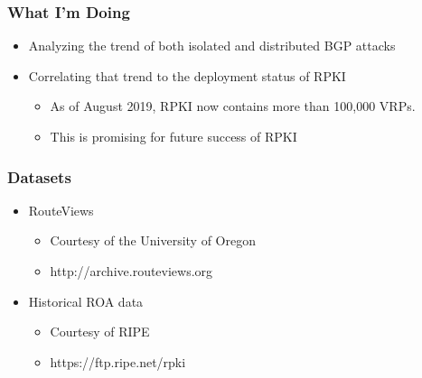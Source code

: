 \documentclass{beamer}
\begin{document}
\begin{frame}
    \frametitle{What I'm Doing}
    \pause
    \begin{itemize}
        \item Analyzing the trend of both isolated and distributed BGP attacks \pause
        \item Correlating that trend to the deployment status of RPKI \pause
        \begin{itemize}
            \item As of August 2019, RPKI now contains more than 100,000 VRPs. \pause
            \item This is promising for future success of RPKI
        \end{itemize}
    \end{itemize}
\end{frame}

\begin{frame}
    \frametitle{Datasets}
    \pause
    \begin{itemize}
        \item RouteViews
        \begin{itemize}
            \item Courtesy of the University of Oregon
            \item http://archive.routeviews.org \pause
        \end{itemize}
        \item Historical ROA data
        \begin{itemize}
            \item Courtesy of RIPE
            \item https://ftp.ripe.net/rpki
        \end{itemize}
    \end{itemize}

\end{frame}
\end{document}
